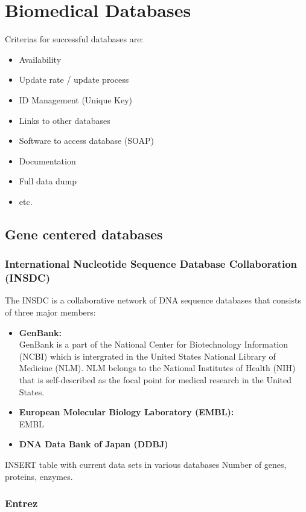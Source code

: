 \section{Biomedical Databases}

Criterias for successful databases are: 
\begin{itemize}
 \item Availability
 \item Update rate / update process
 \item ID Management (Unique Key)
 \item Links to other databases
 \item Software to access database (SOAP)
 \item Documentation
 \item Full data dump 
 \item etc.
\end{itemize}

\subsection{Gene centered databases}

\subsubsection{International Nucleotide Sequence Database Collaboration (INSDC)}

The INSDC is a collaborative network of DNA sequence databases that consists of three major members:
\begin{itemize}
 \item \textbf{GenBank:} \\
 GenBank is a part of the National Center for Biotechnology Information (NCBI) which is intergrated in the United States National Library of Medicine (NLM). NLM belongs to the National Institutes of Health (NIH) that is self-described as the focal point for medical research in the United States.
 \item \textbf{European Molecular Biology Laboratory (EMBL):} \\
 EMBL
 \item \textbf{DNA Data Bank of Japan (DDBJ)} \\
\end{itemize}

INSERT table with current data sets in various databases
Number of genes, proteins, enzymes.

\subsubsection{Entrez}

